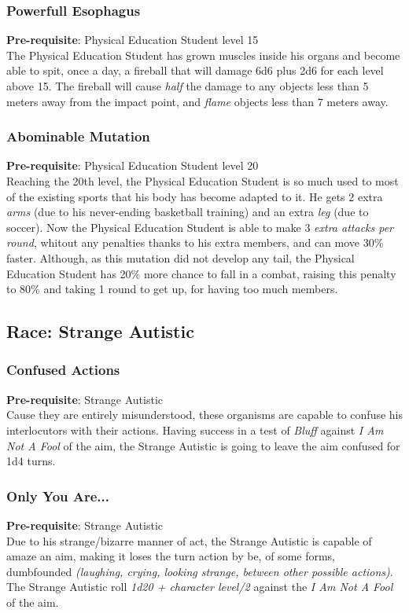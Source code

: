\documentclass[ letterpaper,12pt]{article}
\begin{document}
\subsubsection{Powerfull Esophagus}
 {\bf Pre-requisite}: Physical Education Student level 15\\
 The Physical Education Student has grown muscles inside his organs and become able to spit, once a day, a fireball that will damage 6d6 plus 2d6 for each level above 15. The fireball will cause {\it half} the damage to any objects less than 5 meters away from the impact point, and {\it flame} objects less than 7 meters away.

\subsubsection{Abominable Mutation}
 {\bf Pre-requisite}: Physical Education Student level 20\\
 Reaching the 20th level, the Physical Education Student is so much used to most of the existing sports that his body has become adapted to it. He gets 2 extra {\it arms} (due to his never-ending basketball training) and an extra {\it leg} (due to soccer). Now the Physical Education Student is able to make 3 {\it extra attacks per round}, whitout any penalties thanks to his extra members, and can move 30\% faster. Although, as this mutation did not develop any tail, the Physical Education Student has 20\% more chance to fall in a combat, raising this penalty to 80\% and taking 1 round to get up, for having too much members.

\subsection{Race: Strange Autistic}

\subsubsection{Confused Actions}
{\bf Pre-requisite}: Strange Autistic\\
Cause they are entirely misunderstood, these organisms are capable to confuse his interlocutors with their actions. Having success in a test of {\it Bluff} against {\it I Am Not A Fool} of the aim, the Strange Autistic is going to leave the aim confused for 1d4 turns.

\subsubsection{Only You Are...}
 {\bf Pre-requisite}: Strange Autistic\\
Due to his strange/bizarre manner of act, the Strange Autistic is capable of amaze an aim, making it loses the turn action by be, of some forms, dumbfounded {\it (laughing, crying, looking strange, between other possible actions)}.  The Strange Autistic roll {\it 1d20 + character level/2} against the {\it I Am Not A Fool} of the aim.
\end{document}
